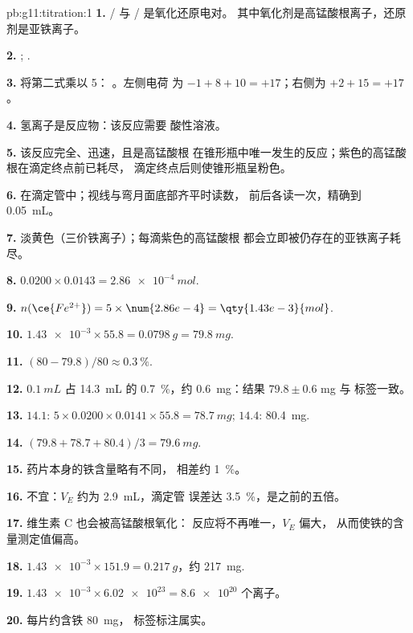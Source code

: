 \begin{solution}{pb:g11:titration:1}
\textbf{1.} / 与 / 是氧化还原电对。
其中氧化剂是高锰酸根离子，还原剂是亚铁离子。

\textbf{2.} ;
.

\textbf{3.} 将第二式乘以 5：
。左侧电荷
为 $-1 + 8 + 10 = +17$；右侧为 $+2 + 15 = +17$。

\textbf{4.} 氢离子是反应物：该反应需要
酸性溶液。

\textbf{5.} 该反应完全、迅速，且是高锰酸根
在锥形瓶中唯一发生的反应；紫色的高锰酸根在滴定终点前已耗尽，
滴定终点后则使锥形瓶呈粉色。

\textbf{6.} 在滴定管中；视线与弯月面底部齐平时读数，
前后各读一次，精确到 \qty{0.05}{mL}。

\textbf{7.} 淡黄色（三价铁离子）；每滴紫色的高锰酸根
都会立即被仍存在的亚铁离子耗尽。

\textbf{8.} $0.0200 \times 0.0143 = \qty{2.86e-4}{mol}$.

\textbf{9.} $n(\ce{Fe^{2+}}) = 5 \times \num{2.86e-4} =
\qty{1.43e-3}{mol}$.

\textbf{10.} $\num{1.43e-3} \times 55.8 = \qty{0.0798}{g} =
\qty{79.8}{mg}$.

\textbf{11.} $(80 - 79.8)/80 \approx \qty{0.3}{\percent}$.

\textbf{12.} $\qty{0.1}{mL}$ 占 \qty{14.3}{mL} 的
\qty{0.7}{\percent}，约 \qty{0.6}{mg}：结果 $79.8 \pm 0.6$ mg 与
标签一致。

\textbf{13.} $14.1$: $5 \times 0.0200 \times 0.0141 \times 55.8 =
\qty{78.7}{mg}$; $14.4$: \qty{80.4}{mg}.

\textbf{14.} $(79.8 + 78.7 + 80.4)/3 = \qty{79.6}{mg}$.

\textbf{15.} 药片本身的铁含量略有不同，
相差约 \qty{1}{\percent}。

\textbf{16.} 不宜：$V_E$ 约为 \qty{2.9}{mL}，滴定管
误差达 \qty{3.5}{\percent}，是之前的五倍。

\textbf{17.} 维生素 C 也会被高锰酸根氧化：
反应将不再唯一，$V_E$ 偏大，
从而使铁的含量测定值偏高。

\textbf{18.} $\num{1.43e-3} \times 151.9 = \qty{0.217}{g}$，约
\qty{217}{mg}.

\textbf{19.} $\num{1.43e-3} \times \num{6.02e23} = \num{8.6e20}$ 个离子。

\textbf{20.} 每片约含铁 \qty{80}{mg}，
标签标注属实。
\end{solution}
